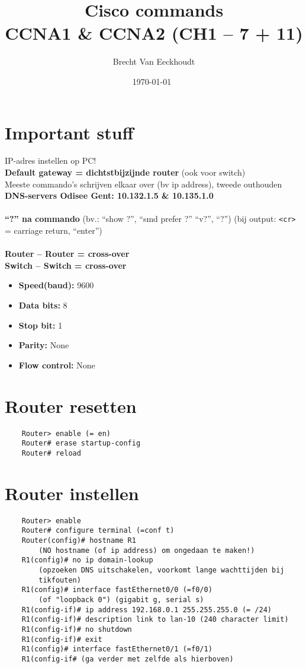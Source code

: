\documentclass[10pt, a4paper]{article}
\title{Cisco commands \\CCNA1 \& CCNA2 (CH1 -- 7 + 11)}
\author{Brecht Van Eeckhoudt}
\date{\today \ \currenttime}
\begin{document}
	\maketitle

	\section{Important stuff}
	IP-adres instellen op PC!\\
	\textbf{Default gateway = dichtstbijzijnde router }(ook voor switch)\\
	Meeste commando's schrijven elkaar over (bv ip address), tweede outhouden\\
	\textbf{DNS-servers Odisee Gent: 10.132.1.5 \& 10.135.1.0}\\ \\
	\textbf{``?'' na commando} (bv.: ``show ?'', ``smd prefer ?'' ``v?'', ``?'') (bij output: \texttt{<cr>} = carriage return, ``enter'')\\ \\
	\textbf{Router -- Router = cross-over}\\
	\textbf{Switch -- Switch = cross-over}\\
	\begin{itemize}[noitemsep,nolistsep]
		\item \textbf{Speed(baud):} 9600
		\item \textbf{Data bits:} 8
		\item \textbf{Stop bit:} 1
		\item \textbf{Parity:} None
		\item \textbf{Flow control:} None\\
	\end{itemize}

	\section{Router resetten}
	\begin{lstlisting}
	Router> enable (= en)
	Router# erase startup-config
	Router# reload
	\end{lstlisting}

	\section{Router instellen}
	\begin{lstlisting}
	Router> enable
	Router# configure terminal (=conf t)
	Router(config)# hostname R1
		(NO hostname (of ip address) om ongedaan te maken!)
	R1(config)# no ip domain-lookup
		(opzoeken DNS uitschakelen, voorkomt lange wachttijden bij
		tikfouten)
	R1(config)# interface fastEthernet0/0 (=f0/0)
		(of "loopback 0") (gigabit g, serial s)
	R1(config-if)# ip address 192.168.0.1 255.255.255.0 (= /24)
	R1(config-if)# description link to lan-10 (240 character limit)
	R1(config-if)# no shutdown
	R1(config-if)# exit
	R1(config)# interface fastEthernet0/1 (=f0/1)
	R1(config-if# (ga verder met zelfde als hierboven)
	\end{lstlisting}
\end{document}
